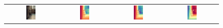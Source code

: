 \documentclass{article}
\begin{document}
\begin{figure}[H]
\begin{tabular}{cccc}
    \includegraphics[width=0.2\textwidth]{images/test-image/inside-03.jpg} &
    \includegraphics[width=0.2\textwidth]{images/trained/inside-03_pred_colored.png} &
    \includegraphics[width=0.2\textwidth]{images/pretrained/inside-03_pred_colored.png} &
    \includegraphics[width=0.2\textwidth]{images/depthmaster/inside-03_pred_colored.jpg} \\


\end{tabular}
\end{figure}
\end{document}
